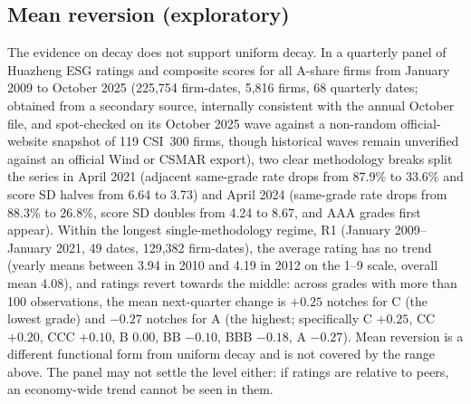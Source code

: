 \documentclass[11pt]{article}
\begin{document}
\subsection{Mean reversion (exploratory)}\label{app:reversion}

The evidence on decay does not support uniform decay. In a quarterly panel of Huazheng ESG ratings and composite scores for all A-share firms from January 2009 to October 2025 (225,754 firm-dates, 5,816 firms, 68 quarterly dates; obtained from a secondary source, internally consistent with the annual October file, and spot-checked on its October 2025 wave against a non-random official-website snapshot of 119 CSI~300 firms, though historical waves remain unverified against an official Wind or CSMAR export), two clear methodology breaks split the series in April 2021 (adjacent same-grade rate drops from 87.9\% to 33.6\% and score SD halves from 6.64 to 3.73) and April 2024 (same-grade rate drops from 88.3\% to 26.8\%, score SD doubles from 4.24 to 8.67, and AAA grades first appear). Within the longest single-methodology regime, R1 (January 2009--January 2021, 49 dates, 129,382 firm-dates), the average rating has no trend (yearly means between 3.94 in 2010 and 4.19 in 2012 on the 1--9 scale, overall mean 4.08), and ratings revert towards the middle: across grades with more than 100 observations, the mean next-quarter change is $+0.25$ notches for C (the lowest grade) and $-0.27$ notches for A (the highest; specifically C $+0.25$, CC $+0.20$, CCC $+0.10$, B $0.00$, BB $-0.10$, BBB $-0.18$, A $-0.27$). Mean reversion is a different functional form from uniform decay and is not covered by the range above. The panel may not settle the level either: if ratings are relative to peers, an economy-wide trend cannot be seen in them.
\end{document}
